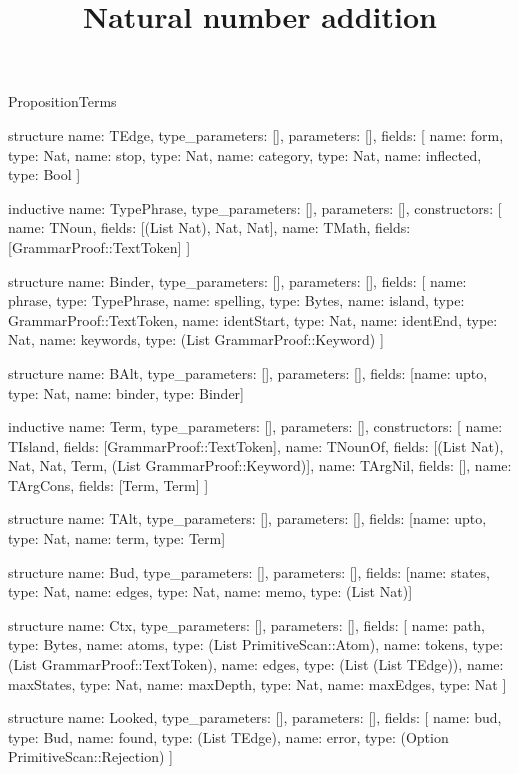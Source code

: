 \begin{lexlean}{PropositionTerms}
\title{Natural number addition}
\begin{semanticmodule}
structure{
  name: TEdge,
  type_parameters: [],
  parameters: [],
  fields: [
    {name: form, type: Nat},
    {name: stop, type: Nat},
    {name: category, type: Nat},
    {name: inflected, type: Bool}
  ]
}

inductive{
  name: TypePhrase,
  type_parameters: [],
  parameters: [],
  constructors: [
    {name: TNoun, fields: [(List Nat), Nat, Nat]},
    {name: TMath, fields: [GrammarProof::TextToken]}
  ]
}

structure{
  name: Binder,
  type_parameters: [],
  parameters: [],
  fields: [
    {name: phrase, type: TypePhrase},
    {name: spelling, type: Bytes},
    {name: island, type: GrammarProof::TextToken},
    {name: identStart, type: Nat},
    {name: identEnd, type: Nat},
    {name: keywords, type: (List GrammarProof::Keyword)}
  ]
}

structure{
  name: BAlt,
  type_parameters: [],
  parameters: [],
  fields: [{name: upto, type: Nat}, {name: binder, type: Binder}]
}

inductive{
  name: Term,
  type_parameters: [],
  parameters: [],
  constructors: [
    {name: TIsland, fields: [GrammarProof::TextToken]},
    {name: TNounOf, fields: [(List Nat), Nat, Nat, Term, (List GrammarProof::Keyword)]},
    {name: TArgNil, fields: []},
    {name: TArgCons, fields: [Term, Term]}
  ]
}

structure{
  name: TAlt,
  type_parameters: [],
  parameters: [],
  fields: [{name: upto, type: Nat}, {name: term, type: Term}]
}

structure{
  name: Bud,
  type_parameters: [],
  parameters: [],
  fields: [{name: states, type: Nat}, {name: edges, type: Nat}, {name: memo, type: (List Nat)}]
}

structure{
  name: Ctx,
  type_parameters: [],
  parameters: [],
  fields: [
    {name: path, type: Bytes},
    {name: atoms, type: (List PrimitiveScan::Atom)},
    {name: tokens, type: (List GrammarProof::TextToken)},
    {name: edges, type: (List (List TEdge))},
    {name: maxStates, type: Nat},
    {name: maxDepth, type: Nat},
    {name: maxEdges, type: Nat}
  ]
}

structure{
  name: Looked,
  type_parameters: [],
  parameters: [],
  fields: [
    {name: bud, type: Bud},
    {name: found, type: (List TEdge)},
    {name: error, type: (Option PrimitiveScan::Rejection)}
  ]
}


\end{semanticmodule}
\end{lexlean}
